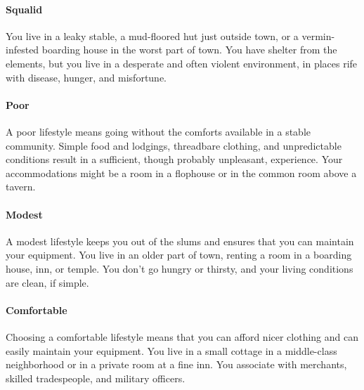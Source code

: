     \paragraph{Squalid}
        You live in a leaky stable, a mud-floored hut just outside town, or a vermin-infested boarding house in the worst part of town.
        You have shelter from the elements, but you live in a desperate and often violent environment, in places rife with disease, hunger, and misfortune.
    \paragraph{Poor}
        A poor lifestyle means going without the comforts available in a stable community.
        Simple food and lodgings, threadbare clothing, and unpredictable conditions result in a sufficient, though probably unpleasant, experience.
        Your accommodations might be a room in a flophouse or in the common room above a tavern.
    \paragraph{Modest}
        A modest lifestyle keeps you out of the slums and ensures that you can maintain your equipment.
        You live in an older part of town, renting a room in a boarding house, inn, or temple.
        You don't go hungry or thirsty, and your living conditions are clean, if simple.
    \paragraph{Comfortable}
        Choosing a comfortable lifestyle means that you can afford nicer clothing and can easily maintain your equipment.
        You live in a small cottage in a middle-class neighborhood or in a private room at a fine inn.
        You associate with merchants, skilled tradespeople, and military officers.
